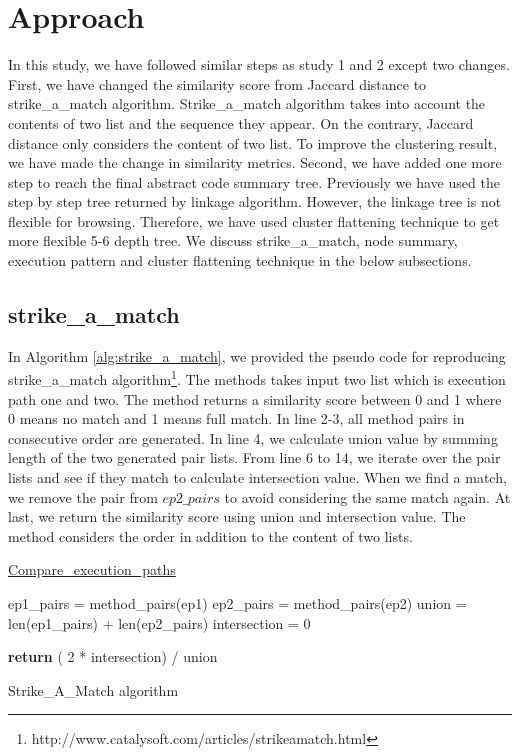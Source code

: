 \section{Approach}
\label{hla3:approach}
In this study, we have followed similar steps as study 1 and 2 except two changes. First, we have changed the similarity score from Jaccard distance to strike\_a\_match algorithm. Strike\_a\_match algorithm takes into account the contents of two list and the sequence they appear. On the contrary, Jaccard distance only considers the content of two list. To improve the clustering result, we have made the change in similarity metrics. Second, we have added one more step to reach the final abstract code summary tree. Previously we have used the step by step tree returned by linkage algorithm. However, the linkage tree is not flexible for browsing. Therefore, we have used cluster flattening technique to get more flexible 5-6 depth tree. We discuss strike\_a\_match, node summary, execution pattern and cluster flattening technique in the below subsections. 

\subsection{strike\_a\_match}
In Algorithm \ref{alg:strike_a_match}, we provided the pseudo code for reproducing strike\_a\_match algorithm\footnote{http://www.catalysoft.com/articles/strikeamatch.html}. The methods takes input two list which is execution path one and two. The method returns a similarity score between 0 and 1 where 0 means no match and 1 means full match. In line 2-3, all method pairs in consecutive order are generated. In line 4, we calculate union value by summing length of the two generated pair lists. From line 6 to 14, we iterate over the pair lists and see if they match to calculate intersection value. When we find a match, we remove the pair from $ep2\_pairs$ to avoid considering the same match again. At last, we return the similarity score using union and intersection value. The method considers the order in addition to the content of two lists. 


\begin{algorithm}
    
    \underline{Compare\_execution\_paths} 
    
    ep1\_pairs = method\_pairs(ep1)\; 
    ep2\_pairs = method\_pairs(ep2)\;
    union = len(ep1\_pairs) + len(ep2\_pairs)\;
    intersection = 0\;
    
    \textbf{return} ( 2 * intersection) / union
    
    \caption{Strike\_A\_Match algorithm}
    \label{alg:strike_a_match}
\end{algorithm}

